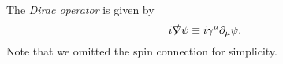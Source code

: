 \documentclass[a4paper,pdftex,10pt]{report}
\begin{document}
The \textit{Dirac operator} is given by
\begin{equation}
  i\slashed{\nabla}\psi
  \equiv
  i\gamma^{\mu}\partial_{\mu}\psi
  .
\end{equation}
Note that we omitted the spin connection for simplicity. 




















\clearpage



\nocite{Peskin:1995}
\nocite{Nair:2005}
\nocite{Weinberg:1996kr}
\nocite{Weinberg:1995mt}
\nocite{Weinberg:2000}

\nocite{Witten:1982df}
\nocite{Witten:1982im}

\nocite{Seiberg:1994aj}
\nocite{Seiberg:1994rs}
\nocite{Alvarez-Gaume:1996ohl}
\nocite{Tachikawa:2013kta}

\end{document}
